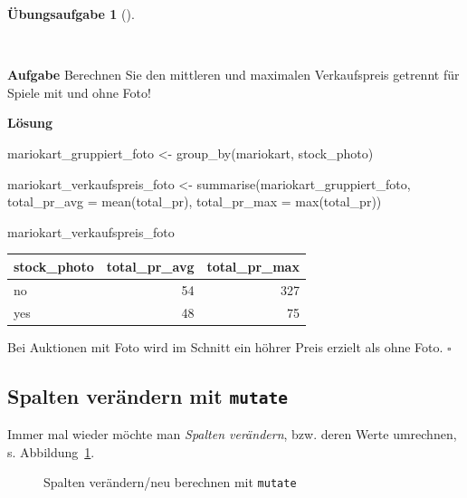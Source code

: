 \documentclass[
  letterpaper,
  oneside,
  open=any]{scrbook}
\newenvironment{Shaded}{\begin{snugshade}}{\end{snugshade}}
\newcommand{\AttributeTok}[1]{\textcolor[rgb]{0.40,0.45,0.13}{#1}}
\newcommand{\FunctionTok}[1]{\textcolor[rgb]{0.28,0.35,0.67}{#1}}
\newcommand{\NormalTok}[1]{\textcolor[rgb]{0.00,0.23,0.31}{#1}}
\newcommand{\OtherTok}[1]{\textcolor[rgb]{0.00,0.23,0.31}{#1}}
\theoremstyle{definition}
\newtheorem{exercise}{Übungsaufgabe}[chapter]
\theoremstyle{definition}
\theoremstyle{definition}
\theoremstyle{remark}
\begin{document}
\begin{exercise}[]\protect\hypertarget{exr-groupby}{}\label{exr-groupby}

~

\textbf{Aufgabe} Berechnen Sie den mittleren und maximalen Verkaufspreis
getrennt für Spiele mit und ohne Foto!

\textbf{Lösung}

\begin{Shaded}
\begin{Highlighting}[]
\NormalTok{mariokart\_gruppiert\_foto }\OtherTok{\textless{}{-}} \FunctionTok{group\_by}\NormalTok{(mariokart, stock\_photo)}

\NormalTok{mariokart\_verkaufspreis\_foto }\OtherTok{\textless{}{-}} 
  \FunctionTok{summarise}\NormalTok{(mariokart\_gruppiert\_foto,}
            \AttributeTok{total\_pr\_avg =} \FunctionTok{mean}\NormalTok{(total\_pr),}
            \AttributeTok{total\_pr\_max =} \FunctionTok{max}\NormalTok{(total\_pr))}

\NormalTok{mariokart\_verkaufspreis\_foto}
\end{Highlighting}
\end{Shaded}

\begin{longtable}[]{@{}lrr@{}}
\toprule\noalign{}
stock\_photo & total\_pr\_avg & total\_pr\_max \\
\midrule\noalign{}
\endhead
\bottomrule\noalign{}
\endlastfoot
no & 54 & 327 \\
yes & 48 & 75 \\
\end{longtable}

Bei Auktionen mit Foto wird im Schnitt ein höhrer Preis erzielt als ohne
Foto. \(\square\)

\end{exercise}

\subsection{\texorpdfstring{Spalten verändern mit
\texttt{mutate}}{Spalten verändern mit mutate}}\label{spalten-veruxe4ndern-mit-mutate}

Immer mal wieder möchte man \emph{Spalten verändern}, bzw. deren Werte
umrechnen, s. Abbildung~\ref{fig-mutate}.

\begin{figure}


\caption{\label{fig-mutate}Spalten verändern/neu berechnen mit
\texttt{mutate}}

\end{figure}%
\end{document}

